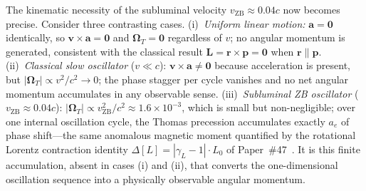 \documentclass[%
 reprint, amsmath,amssymb, aps, prb, ]{revtex4-2}
\numberwithin{equation}{section}
\begin{document}
The kinematic necessity of the subluminal velocity $v_\mathrm{ZB}\approx 0.04c$ now becomes precise. Consider three contrasting cases. (i)~\emph{Uniform linear motion:} $\mathbf{a}=\mathbf{0}$ identically, so $\mathbf{v}\times\mathbf{a}=\mathbf{0}$ and $\boldsymbol{\Omega}_T = \mathbf{0}$ regardless of $v$; no angular momentum is generated, consistent with the classical result $\mathbf{L}=\mathbf{r}\times\mathbf{p}=\mathbf{0}$ when $\mathbf{r}\parallel\mathbf{p}$. (ii)~\emph{Classical slow oscillator} ($v\ll c$): $\mathbf{v}\times\mathbf{a}\neq\mathbf{0}$ because acceleration is present, but $|\boldsymbol{\Omega}_T| \propto v^2/c^2 \to 0$; the phase stagger per cycle vanishes and no net angular momentum accumulates in any observable sense. (iii)~\emph{Subluminal ZB oscillator} ($v_\mathrm{ZB}\approx 0.04c$): $|\boldsymbol{\Omega}_T| \propto v_\mathrm{ZB}^2/c^2 \approx 1.6\times 10^{-3}$, which is small but non-negligible; over one internal oscillation cycle, the Thomas precession accumulates exactly $a_e$ of phase shift---the same anomalous magnetic moment quantified by the rotational Lorentz contraction identity $\Delta[L]=|\gamma_L-1|\cdot L_0$ of Paper~\#47~\cite{hanamura47}. It is this finite accumulation, absent in cases (i) and (ii), that converts the one-dimensional oscillation sequence into a physically observable angular momentum.
\end{document}
